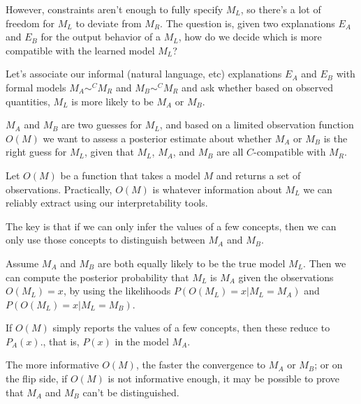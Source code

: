\documentclass{article}
\begin{document}
However, constraints aren't enough to fully specify $M_L$, so there's a lot of freedom for $M_L$ to deviate from $M_R$. The question is, given two explanations $E_A$ and $E_B$ for the output behavior of a $M_L$, how do we decide which is more compatible with the learned model $M_L$?

Let's associate our informal (natural language, etc) explanations $E_A$ and $E_B$ with formal models $M_A\sim^C M_R$ and $M_B\sim^C M_R$ and ask whether based on observed quantities, $M_L$ is more likely to be $M_A$ or $M_B$.

$M_A$ and $M_B$ are two guesses for $M_L$, and based on a limited observation function $O(M)$ we want to assess a posterior estimate about whether $M_A$ or $M_B$ is the right guess for $M_L$, given that $M_L$, $M_A$, and $M_B$ are all $C$-compatible with $M_R$.

\begin{definition}
  Let $O(M)$ be a function that takes a model $M$ and returns a set of observations. Practically, $O(M)$ is whatever information about $M_L$ we can reliably extract using our interpretability tools. 
  
  The key is that if we can only infer the values of a few concepts, then we can only use those concepts to distinguish between $M_A$ and $M_B$.
\end{definition}

Assume $M_A$ and $M_B$ are both equally likely to be the true model $M_L$. Then we can compute the posterior probability that $M_L$ is $M_A$ given the observations $O(M_L)=x$, by using the likelihoods $P(O(M_L)=x|M_L=M_A)$ and $P(O(M_L)=x|M_L=M_B)$.

If $O(M)$ simply reports the values of a few concepts, then these reduce to $P_A(x)$., that is, $P(x)$ in the model $M_A$.

The more informative $O(M)$, the faster the convergence to $M_A$ or $M_B$; or on the flip side, if $O(M)$ is not informative enough, it may be possible to prove that $M_A$ and $M_B$ can't be distinguished.
\end{document}

